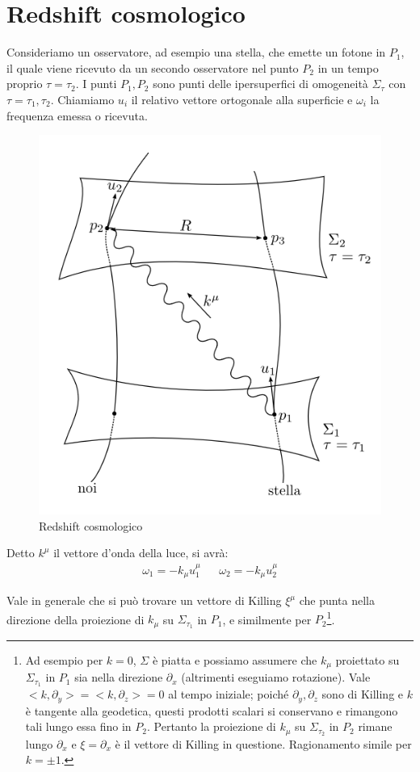 \section{Redshift cosmologico}
Consideriamo un osservatore, ad esempio una stella, che emette un fotone in $P_1$, il quale viene ricevuto da un secondo osservatore nel punto $P_2$ in un tempo proprio $\tau=\tau_2$. I punti $P_1, P_2$ sono punti delle ipersuperfici di omogeneità $\Sigma_\tau$ con $\tau = \tau_1, \tau_2$. Chiamiamo $u_i$ il relativo vettore ortogonale alla superficie e $\omega_i$ la frequenza emessa o ricevuta.
\begin{figure}
    \centering
    \includegraphics[scale=0.6]{immagini/redshiftcosmo.png}
    \caption{Redshift cosmologico}
    \label{fig.redshiftcosmo}
\end{figure}
Detto $k^\mu$ il vettore d'onda della luce, si avrà:
\begin{align*}
    \omega_1 = -k_\mu u_1^\mu && \omega_2 = - k_\mu u_2^\mu
\end{align*}

Vale in generale che si può trovare un vettore di Killing $\xi^\mu$ che punta nella direzione della proiezione di $k_\mu$ su $\Sigma_{\tau_1}$ in $P_1$, e similmente per $P_2$\footnote{Ad esempio per $k=0$, $\Sigma$ è piatta e possiamo assumere che $k_\mu$ proiettato su $\Sigma_{\tau_1}$ in $P_1$ sia nella direzione $\partial_x$ (altrimenti eseguiamo rotazione). Vale $<k,\partial_y> = < k, \partial_z> = 0$ al tempo iniziale; poiché $\partial_y, \partial_z$ sono di Killing e $k$ è tangente alla geodetica, questi prodotti scalari si conservano e rimangono tali lungo essa fino in $P_2$. Pertanto la proiezione di $k_\mu$ su $\Sigma_{\tau_2}$ in $P_2$ rimane lungo $\partial_x$ e $\xi =\partial_x$ è il vettore di Killing in questione. Ragionamento simile per $k=\pm 1$.}.

